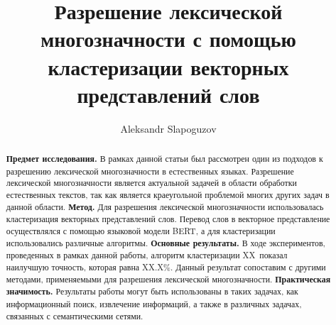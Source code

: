 \documentclass[11pt]{article}
\title{Разрешение лексической многозначности с помощью кластеризации векторных представлений слов}
\author{Aleksandr Slapoguzov}
\begin{document}
    \maketitle
    \begin{abstract}
        \textbf{Предмет исследования.} В рамках данной статьи был рассмотрен один из подходов к разрешению
        лексической многозначности в естественных языках.
        Разрешение лексической многозначности является актуальной задачей в области обработки естественных текстов,
        так как является краеугольной проблемой многих других задач в данной области.
        \textbf{Метод.} Для разрешения лексической многозначности использовалась
        кластеризация векторных представлений слов.
        Перевод слов в векторное представление осуществлялся с помощью языковой модели BERT, а для кластеризации
        использовались различные алгоритмы.
        \textbf{Основные результаты.} В ходе экспериментов, проведенных в рамках данной работы,
        алгоритм кластеризации XX\ показал наилучшую точность, которая равна XX.X\%.
        Данный результат сопоставим с другими методами, применяемыми для разрешения лексической многозначности.
        \textbf{Практическая значимость.} Результаты работы могут быть использованы в таких задачах, как информационный
        поиск, извлечение информаций, а также в различных задачах, связанных с семантическими сетями.
    \end{abstract}
\end{document}
